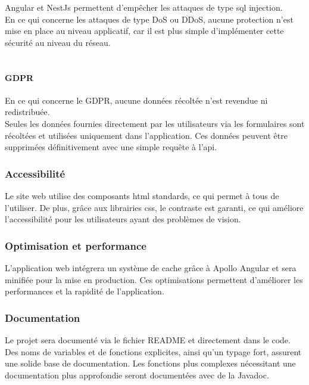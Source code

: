 Angular et NestJs permettent d'empêcher les attaques de type \Gls{sql} injection. \\

En ce qui concerne les attaques de type DoS ou DDoS, aucune protection n'est mise en place au niveau applicatif, car il est plus simple d'implémenter cette sécurité au niveau du réseau.\\\\

\paragraph{GDPR}
En ce qui concerne le GDPR, aucune données récoltée n'est revendue ni redistribuée.\\

Seules les données fournies directement par les utilisateurs via les formulaires sont récoltées et utilisées uniquement dans l'application.
Ces données peuvent être supprimées définitivement avec une simple requête à l'\Gls{api}\@.

\subsubsection{Accessibilité}

Le site web utilise des composants \Gls{html} standards, ce qui permet à tous de l'utiliser.
De plus, grâce aux librairies \Gls{css}, le contraste est garanti, ce qui améliore l'accessibilité pour les utilisateurs ayant des problèmes de vision.

\subsubsection{Optimisation et performance}

L'application web intégrera un système de cache grâce à Apollo Angular et sera minifiée pour la mise en production.
Ces optimisations permettent d'améliorer les performances et la rapidité de l'application.

\subsubsection{Documentation}

Le projet sera documenté via le fichier README et directement dans le code.
Des noms de variables et de fonctions explicites, ainsi qu'un typage fort, assurent une solide base de documentation.
Les fonctions plus complexes nécessitant une documentation plus approfondie seront documentées avec de la Javadoc.\\

